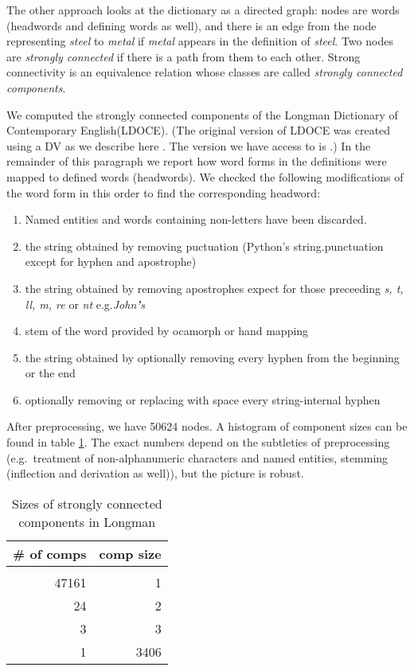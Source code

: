 \documentclass[a4paper,10pt]{article}
\begin{document}
The other approach looks at the dictionary as a directed graph: nodes are
words (headwords and defining words as well), and there is an edge from the
node representing \emph{steel} to \emph{metal} if \emph{metal} appears in the
definition of \emph{steel}. Two nodes are \emph{strongly connected} if there
is a path from them to each other. Strong connectivity is an equivalence
relation whose classes are called \emph{strongly connected components}. 

We computed the strongly connected components of the Longman Dictionary of
Contemporary English(LDOCE). (The original version of LDOCE was created using
a DV as we describe here \cite{Boguraev:1989}. The version we have access to
is \cite{Bullon:2003}.) In the remainder of this paragraph we report how word
forms in the definitions were mapped to defined words (headwords). We checked
the following modifications of the word form in this order to find the
corresponding headword:
\begin{enumerate}
 \item Named entities and words containing non-letters have been discarded.
 \item the string obtained by removing puctuation (Python's string.punctuation except for hyphen and apostrophe)
 \item the string obtained by removing apostrophes expect for those preceeding \emph{s, t, ll, m, re} or \emph{nt} e.g.\emph{John\textbf{'}s}
 \item stem of the word provided by ocamorph \cite{ocamorph} or hand mapping
 \item the string obtained by optionally removing every hyphen from the beginning or the end
 \item optionally removing or replacing with space every string-internal hyphen
\end{enumerate}

After preprocessing, we have 50624
nodes. A histogram of component sizes can be found in table
\ref{table_compon}. The exact numbers depend on the subtleties of
preprocessing (e.g.\ treatment of non-alphanumeric characters and named
entities, stemming (inflection and derivation as well)), but the picture is
robust.


\begin{table}
 \begin{center}
  \begin{tabular}{rr}
   \toprule
   \# of comps & comp size
   \\\midrule
   \\  47161	& 1
   \\  24	& 2
   \\  3	& 3
   \\  1        & 3406
   \\ \bottomrule
  \end{tabular}
  \caption{Sizes of strongly connected components in Longman}
  \label{table_compon}
 \end{center}
\end{table}
\end{document}
